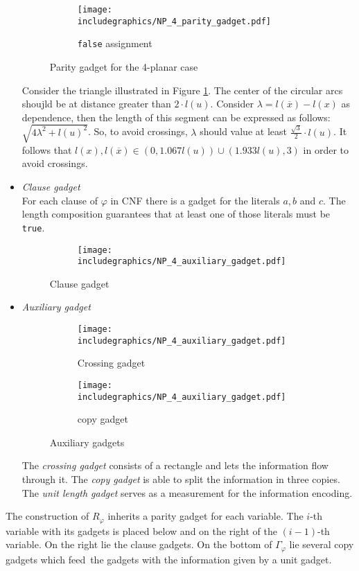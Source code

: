 \begin{sketch}
\begin{itemize}
\begin{figure}[H]
			\begin{subfigure}{0.4\textwidth}
				\centering
				\texttt{[image: includegraphics/NP\_4\_parity\_gadget.pdf]}
				\caption{\texttt{false} assignment}\label{im:4-triangle}
			\end{subfigure}
			\caption{Parity gadget for the 4-planar case}\label{im:4-parity-gadgets}
		\end{figure}
	Consider the triangle illustrated in Figure \ref{im:4-triangle}. The center of the circular arcs shoujld be at distance greater than $2\cdot l(u)$. Consider $\lambda = l(\overline{x}) - l(x)$ as dependence, then the length of this segment can be expressed as follows: $\sqrt{4\lambda^2 + l(u)^2}$. So, to avoid crossings, $\lambda$ should value at least $\frac{\sqrt{3} }{2}\cdot l(u)$. It follows that $l(x),l(\overline{x} ) \in (0,1.067 l(u) )\cup (1.933 l(u),3)$ in order to avoid crossings.
		\item \textit{Clause gadget}\\ For each clause of $\varphi$ in CNF there is a gadget for the literals $a,b$ and $c$. The length composition guarantees that at least one of those literals must be \texttt{true}.
		\begin{figure}[H]
			\centering
			\begin{subfigure}{0.4\textwidth}
				\centering
				\texttt{[image: includegraphics/NP\_4\_auxiliary\_gadget.pdf]}

			\end{subfigure}
						\caption{Clause gadget}
		\end{figure}
		\item \textit{Auxiliary gadget}\\
		\begin{figure}[H]
			\centering
			\begin{subfigure}{0.4\textwidth}
				\centering
				\texttt{[image: includegraphics/NP\_4\_auxiliary\_gadget.pdf]}
				\caption{Crossing gadget}
			\end{subfigure}
			\begin{subfigure}{0.4\textwidth}
				\centering
				\texttt{[image: includegraphics/NP\_4\_auxiliary\_gadget.pdf]}
				\caption{copy gadget}
			\end{subfigure}	
		\caption{Auxiliary gadgets}
	\end{figure}
		The \textit{crossing gadget} consists of a rectangle and lets the information flow \grqq through it\grqq. The \textit{copy gadget} is able to split the information in three copies. The \textit{unit length gadget} serves as a measurement for the information encoding.
	\end{itemize}
	The construction of $R_\varphi$ inherits a parity gadget for each variable. The $i$-th variable with its gadgets is placed below and on the right of the $(i-1)$-th variable. On the right lie the clause gadgets. On the bottom of $\Gamma_\varphi$ lie several copy gadgets which \grqq feed\grqq~the gadgets with the information given by a unit gadget. 

\end{sketch}
